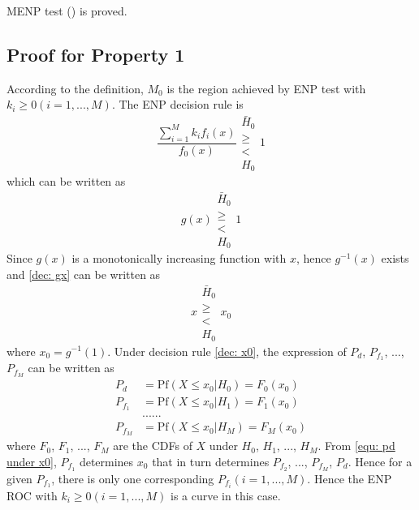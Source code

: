 \documentclass[12pt,journal,a4paper,twoside,onecolumn]{IEEEtran}
\newcommand{\rmnum}[1]{\romannumeral #1}
\begin{document}
\begin{spacing}{2.5}
MENP test (\rmnum{2}) is proved.

\subsection{Proof for Property 1}
According to the definition, $M_0$ is the region achieved by ENP test with $k_i \geq 0 (i=1, ..., M)$. The ENP decision rule is
\begin{equation}
\frac{\sum_{i=1}^{M}k_if_i(x)}{f_0(x)} \substack{\bar{H}_0 \\\geq\\< \\H_0}1
\end{equation}
which can be written as
\begin{equation}
\label{dec: gx}
g(x)\substack{\bar{H}_0 \\\geq\\< \\H_0}1
\end{equation}
Since $g(x)$ is a monotonically increasing function with $x$, hence $g^{-1}(x)$ exists and \eqref{dec: gx} can be written as 
\begin{equation}
\label{dec: x0}
x\substack{\bar{H}_0 \\\geq\\< \\H_0}x_0
\end{equation}
where $x_0 = g^{-1}(1)$.
Under decision rule \eqref{dec: x0}, the expression of $P_d$, $P_{f_1}$, ..., $P_{f_M}$ can be written as 
\begin{equation}
\begin{split}
\label{equ: pd under x0}
P_d &= \text{Pf}(X \leq x_0 | H_0) = F_0(x_0)\\
P_{f_1} &= \text{Pf}(X \leq x_0 | H_1) = F_1(x_0)\\
  &......\\
P_{f_M} &= \text{Pf}(X \leq x_0 | H_M) = F_M(x_0)
\end{split}
\end{equation}
where $F_0$, $F_1$, ..., $F_M$ are the CDFs of $X$ under $H_0$, $H_1$, ..., $H_M$. From \eqref{equ: pd under x0}, $P_{f_1}$ determines $x_0$ that in turn determines $P_{f_2}$, ..., $P_{f_M}$, $P_d$. Hence for a given $P_{f_1}$, there is only one corresponding $P_{f_i} (i= 1, ..., M)$. Hence the ENP ROC with $k_i \geq 0 (i = 1, ..., M)$ is a curve in this case.


\end{spacing}
\end{document}
